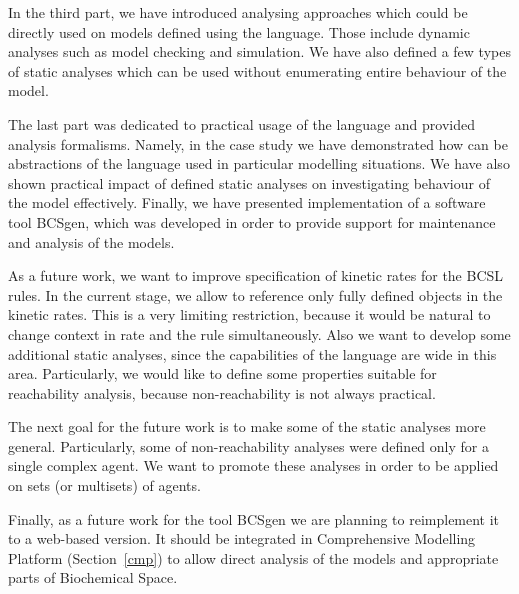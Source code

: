 \documentclass[12pt, twoside]{fithesis2} %
\begin{document}
In the third part, we have introduced analysing approaches which could be directly used on models defined using the language. Those include dynamic analyses such as model checking and simulation. We have also defined a few types of static analyses which can be used without enumerating entire behaviour of the model.

The last part was dedicated to practical usage of the language and provided analysis formalisms. Namely, in the case study we have demonstrated how can be abstractions of the language used in particular modelling situations. We have also shown practical impact of defined static analyses on investigating behaviour of the model effectively. Finally, we have presented implementation of a software tool BCSgen, which was developed in order to provide support for maintenance and analysis of the models.

As a future work, we want to improve specification of kinetic rates for the BCSL rules. In the current stage, we allow to reference only fully defined objects in the kinetic rates. This is a very limiting restriction, because it would be natural to change context in rate and the rule simultaneously. Also we want to develop some additional static analyses, since the capabilities of the language are wide in this area. Particularly, we would like to define some properties suitable for reachability analysis, because non-reachability is not always practical.

The next goal for the future work is to make some of the static analyses more general. Particularly, some of non-reachability analyses were defined only for a single complex agent. We want to promote these analyses in order to be applied on sets (or multisets) of agents.

Finally, as a future work for the tool BCSgen we are planning to reimplement it to a web-based version. It should be integrated in Comprehensive Modelling Platform (Section~\ref{cmp}) to allow direct analysis of the models and appropriate parts of Biochemical Space.


\end{document}
